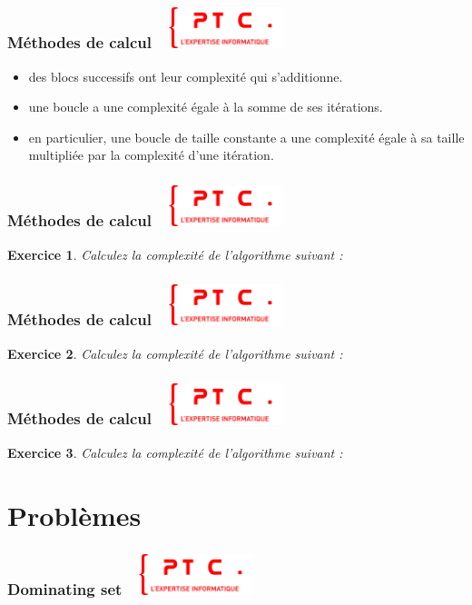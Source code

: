 \documentclass[11pt]{beamer}
\newenvironment{slide}[1]{%
\begin{frame}[environment=slide]
\frametitle{#1~\hfill~\includegraphics[height=1.2cm]{./epitech.png}}
}{%
\end{frame}
}
\newtheorem{exercice}{Exercice}
\newcommand{\Python}[1]{
	{\small	}
}
\newenvironment{pyenvsmall}
	{ \ttfamily \tiny }
	{\par  }
\newcommand{\Pythonsmall}[1]{
	\begin{pyenvsmall}
		\vspace{-0.25cm}
		
		\vspace{-0.3cm}
	\end{pyenvsmall}
}
\begin{document}
\begin{slide}{Méthodes de calcul}
\begin{itemize}
\item des blocs successifs ont leur complexité qui s'additionne.
\item une boucle a une complexité égale à la somme de ses itérations.
\item en particulier, une boucle de taille constante a une complexité égale à sa taille multipliée par la complexité d'une itération.
\end{itemize}
\end{slide}

\begin{slide}{Méthodes de calcul}
\begin{exercice}
Calculez la complexité de l'algorithme suivant :
\end{exercice}
\Python{ex21a}
\end{slide}

\begin{slide}{Méthodes de calcul}
\begin{exercice}
Calculez la complexité de l'algorithme suivant :
\end{exercice}
\Pythonsmall{ex21b}
\end{slide}

\begin{slide}{Méthodes de calcul}
\begin{exercice}
Calculez la complexité de l'algorithme suivant :
\end{exercice}
\Python{glou}

\end{slide}

\section{Problèmes}

\begin{slide}{Dominating set}
\begin{center}
\end{center}
\end{slide}
\end{document}
